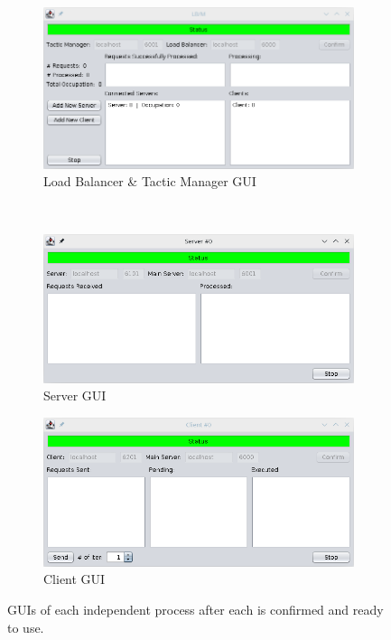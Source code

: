 \documentclass[12pt]{article}
\begin{document}
\begin{figure}[H]
  \centering
  \begin{subfigure}{.55\textwidth}
    \centering
    \includegraphics[width=.95\linewidth]{img/LBM_confirmed.png}
    \caption{Load Balancer \& Tactic Manager GUI}
    \label{fig:LBM_confirmed}
  \end{subfigure} \\
  \begin{subfigure}{.5\textwidth}
    \centering
    \includegraphics[width=.95\linewidth]{img/S_confirmed.png}
    \caption{Server GUI}
    \label{fig:S_confirmed}
  \end{subfigure}%
  \begin{subfigure}{.5\textwidth}
    \centering
    \includegraphics[width=.95\linewidth]{img/C_confirmed.png}
    \caption{Client GUI}
    \label{fig:C_confirmed}
  \end{subfigure}
  \caption{GUIs of each independent process after each is confirmed and ready to use.}
  \label{fig:GUIs_confirmed}
\end{figure} 
\end{document}

